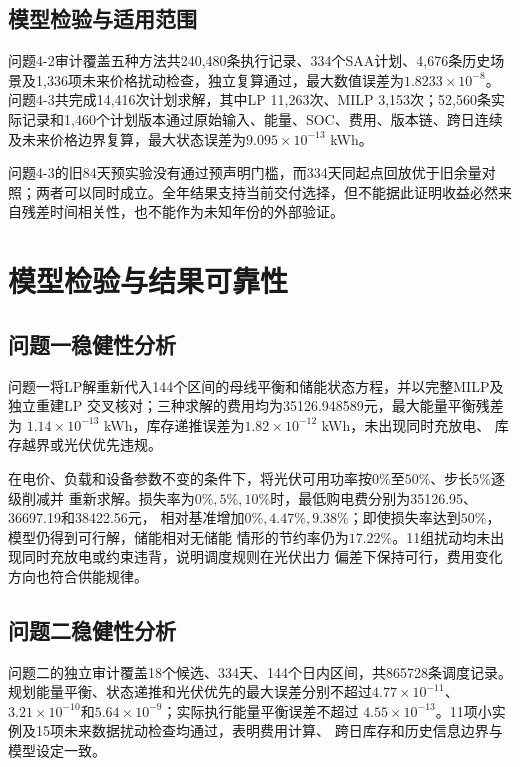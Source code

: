 \documentclass[UTF8,a4paper,12pt]{ctexart}
\begin{document}
\subsection{模型检验与适用范围}
问题4-2审计覆盖五种方法共240,480条执行记录、334个SAA计划、4,676条历史场景及1,336项未来价格扰动检查，独立复算通过，最大数值误差为$1.8233\times10^{-8}$。问题4-3共完成14,416次计划求解，其中LP 11,263次、MILP 3,153次；52,560条实际记录和1,460个计划版本通过原始输入、能量、SOC、费用、版本链、跨日连续及未来价格边界复算，最大状态误差为$9.095\times10^{-13}$ kWh。

问题4-3的旧84天预实验没有通过预声明门槛，而334天同起点回放优于旧余量对照；两者可以同时成立。全年结果支持当前交付选择，但不能据此证明收益必然来自残差时间相关性，也不能作为未知年份的外部验证。


\section{模型检验与结果可靠性}

\subsection{问题一稳健性分析}

问题一将LP解重新代入144个区间的母线平衡和储能状态方程，并以完整MILP及独立重建LP
交叉核对；三种求解的费用均为35126.948589元，最大能量平衡残差为
$1.14\times10^{-13}$ kWh，库存递推误差为$1.82\times10^{-12}$ kWh，未出现同时充放电、
库存越界或光伏优先违规。

在电价、负载和设备参数不变的条件下，将光伏可用功率按$0\%$至$50\%$、步长$5\%$逐级削减并
重新求解。损失率为$0\%,5\%,10\%$时，最低购电费分别为35126.95、36697.19和38422.56元，
相对基准增加$0\%,4.47\%,9.38\%$；即使损失率达到$50\%$，模型仍得到可行解，储能相对无储能
情形的节约率仍为$17.22\%$。11组扰动均未出现同时充放电或约束违背，说明调度规则在光伏出力
偏差下保持可行，费用变化方向也符合供能规律。

\subsection{问题二稳健性分析}

问题二的独立审计覆盖18个候选、334天、144个日内区间，共865728条调度记录。
规划能量平衡、状态递推和光伏优先的最大误差分别不超过$4.77\times10^{-11}$、
$3.21\times10^{-10}$和$5.64\times10^{-9}$；实际执行能量平衡误差不超过
$4.55\times10^{-13}$。11项小实例及15项未来数据扰动检查均通过，表明费用计算、
跨日库存和历史信息边界与模型设定一致。
\end{document}
